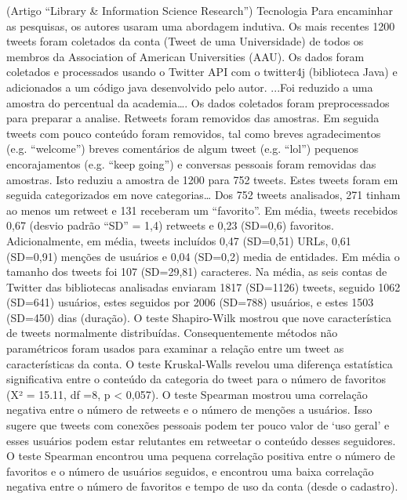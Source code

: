 (Artigo ``Library \& Information Science Research'')
Tecnologia
Para encaminhar as pesquisas, os autores usaram uma abordagem indutiva. Os mais recentes 1200 tweets foram coletados da conta (Tweet de uma Universidade) de todos os membros da Association of American Universities (AAU). Os dados foram coletados e processados usando o Twitter API com o twitter4j (biblioteca Java) e adicionados a um código java desenvolvido pelo autor. ...Foi reduzido a uma amostra do percentual da academia….
Os dados coletados foram preprocessados para preparar a analise. Retweets foram removidos das amostras. Em seguida tweets com pouco conteúdo foram removidos, tal como breves agradecimentos (e.g. “welcome”) breves comentários de algum tweet (e.g. “lol”) pequenos encorajamentos (e.g. “keep going”) e conversas pessoais foram removidas das amostras. Isto reduziu a amostra de 1200 para 752 tweets. Estes tweets foram em seguida categorizados em nove categorias…
Dos 752 tweets analisados, 271 tinham ao menos um retweet e 131 receberam um “favorito”. Em média, tweets recebidos 0,67 (desvio padrão “SD” = 1,4) retweets e 0,23 (SD=0,6) favoritos. Adicionalmente, em média, tweets incluídos 0,47 (SD=0,51) URLs, 0,61 (SD=0,91) menções de usuários e 0,04 (SD=0,2) media de entidades. Em média o tamanho dos tweets foi 107 (SD=29,81) caracteres.
Na média, as seis contas de Twitter das bibliotecas analisadas enviaram 1817 (SD=1126) tweets, seguido 1062 (SD=641) usuários, estes seguidos por 2006 (SD=788) usuários, e estes 1503 (SD=450) dias (duração). O teste Shapiro-Wilk mostrou que nove característica de tweets normalmente distribuídas. Consequentemente métodos não paramétricos foram usados para examinar a relação entre um tweet  as características da conta.
O teste Kruskal-Walls revelou uma diferença estatística significativa entre o conteúdo da categoria do tweet para o número de favoritos (X² = 15.11, df =8, p < 0,057).
O teste Spearman mostrou uma correlação negativa entre o número de retweets e o número de menções a usuários. Isso sugere que tweets com conexões pessoais podem ter pouco valor de ‘uso geral’ e esses usuários podem estar relutantes em retweetar o conteúdo desses seguidores.
O teste Spearman encontrou uma pequena correlação positiva entre o número de favoritos e o número de usuários seguidos, e encontrou uma baixa correlação negativa entre o número de favoritos e tempo de uso da conta (desde o cadastro).


